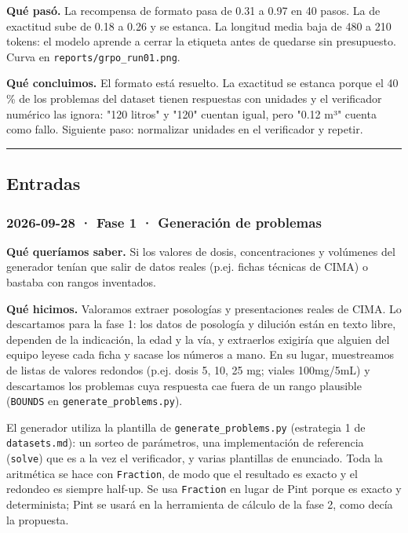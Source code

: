 \textbf{Qué pasó.} La recompensa de formato pasa de 0.31 a 0.97 en 40 pasos. La de exactitud sube
de 0.18 a 0.26 y se estanca. La longitud media baja de 480 a 210 tokens: el modelo aprende a
cerrar la etiqueta antes de quedarse sin presupuesto. Curva en \texttt{reports/\allowbreak{}grpo\_\allowbreak{}run01.png}.

\textbf{Qué concluimos.} El formato está resuelto. La exactitud se estanca porque el 40 \% de los
problemas del dataset tienen respuestas con unidades y el verificador numérico las ignora:
"120 litros" y "120" cuentan igual, pero "0.12 m³" cuenta como fallo. Siguiente paso:
normalizar unidades en el verificador y repetir.

\begin{center}\rule{0.5\linewidth}{0.5pt}\end{center}

\subsection{Entradas}

\subsubsection{2026-09-28 · Fase 1 · Generación de problemas}

\textbf{Qué queríamos saber.} Si los valores de dosis, concentraciones y volúmenes del generador
tenían que salir de datos reales (p.ej. fichas técnicas de CIMA) o bastaba con rangos inventados.

\textbf{Qué hicimos.} Valoramos extraer posologías y presentaciones reales de CIMA. Lo descartamos
para la fase 1: los datos de posología y dilución están en texto libre, dependen de la indicación,
la edad y la vía, y extraerlos exigiría que alguien del equipo leyese cada ficha y sacase los
números a mano. En su lugar, muestreamos de listas de valores redondos (p.ej. dosis 5, 10, 25 mg;
viales 100mg/5mL) y descartamos los problemas cuya respuesta cae fuera de un rango plausible
(\texttt{BOUNDS} en \texttt{generate\_\allowbreak{}problems.py}).

El generador utiliza la plantilla de \texttt{generate\_\allowbreak{}problems.py} (estrategia 1 de \texttt{datasets.md}):
un sorteo de parámetros, una implementación de referencia (\texttt{solve}) que es a la vez el verificador,
y varias plantillas de enunciado. Toda la aritmética se hace con \texttt{Fraction}, de modo que el resultado
es exacto y el redondeo es siempre half-up. Se usa \texttt{Fraction} en lugar de Pint porque es exacto
y determinista; Pint se usará en la herramienta de cálculo de la fase 2, como decía la propuesta.

